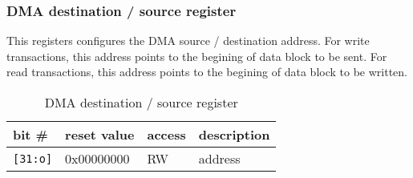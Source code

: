     \subsubsection{DMA destination / source register}
    \label{sec:dst_src_reg}
    
    This registers configures the DMA source / destination address. For write transactions, this address points to the begining of data block to be sent.
    For read transactions, this address points to the begining of data block to be written.
    
    \begin{table}[H]
    \caption{DMA destination / source register}
        \begin{tabular}{m{1.3cm}|m{2cm}|m{1cm}|m{8cm}}
                \rowcolor[gray]{0.7} bit \# & reset value & access & description \\ \hline \hline
                \texttt{[31:o]} & 0x00000000 & RW & address \\ \hline
                \hline
        \end{tabular}
        \label{tab:dst_src_reg}
    \end{table}
    